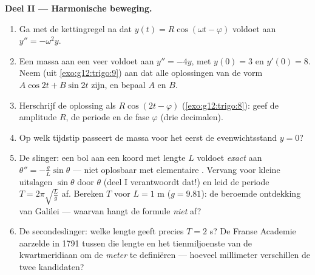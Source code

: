 \begin{problem}
\medskip
\noindent\textbf{Deel II --- Harmonische beweging.}
\begin{enumerate}[resume]
  \item Ga met de kettingregel na dat $y(t) = R\cos(\omega t - \varphi)$
        voldoet aan $y'' = -\omega^2 y$.
  \item Een massa aan een veer voldoet aan $y'' = -4y$, met $y(0) = 3$ en
        $y'(0) = 8$. Neem (uit \cref{exo:g12:trigo:9}) aan dat alle
        oplossingen van de vorm $A\cos 2t + B\sin 2t$ zijn, en bepaal $A$ en
        $B$.
  \item Herschrijf de oplossing als $R\cos(2t - \varphi)$
        (\cref{exo:g12:trigo:8}): geef de amplitude $R$, de periode en de
        fase $\varphi$ (drie decimalen).
  \item Op welk tijdstip passeert de massa voor het eerst de evenwichtsstand
        $y = 0$?
  \item De slinger: een bol aan een koord met lengte $L$ voldoet
        \emph{exact} aan $\theta'' = -\frac gL \sin\theta$ --- niet oplosbaar
        met elementaire . Vervang voor kleine uitslagen $\sin\theta$
        door $\theta$ (deel I verantwoordt dat!) en leid de periode
        $T = 2\pi\sqrt{\frac Lg}$ af. Bereken $T$ voor $L = 1$ m
        ($g = 9.81$): de beroemde ontdekking van Galilei --- waarvan hangt de
        formule \emph{niet} af?
  \item De secondeslinger: welke lengte geeft precies $T = 2$ s? De Franse
        Academie aarzelde in 1791 tussen die lengte en het tienmiljoenste van
        de kwartmeridiaan om de \emph{meter} te definiëren --- hoeveel
        millimeter verschillen de twee kandidaten?
\end{enumerate}


\end{problem}
